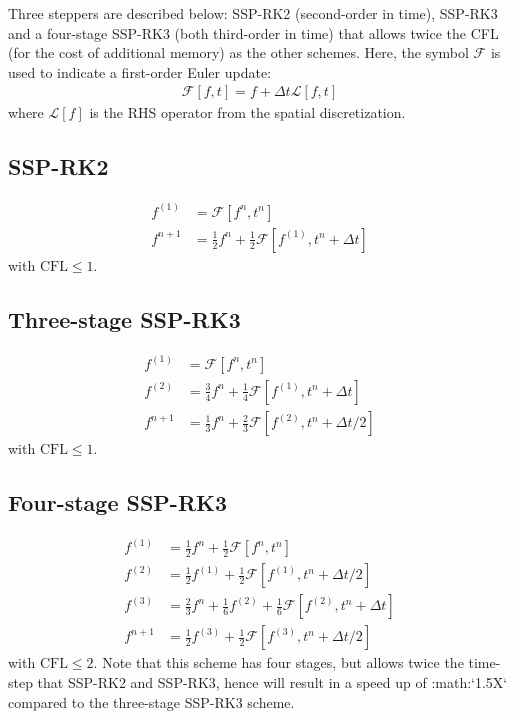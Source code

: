 \documentclass[12pt]{article}
\theoremstyle{definition}
\theoremstyle{definition}
\theoremstyle{definition}
\begin{document}
Three steppers are described below: SSP-RK2 (second-order in time),
SSP-RK3 and a four-stage SSP-RK3 (both third-order in time) that
allows twice the CFL (for the cost of additional memory) as the other
schemes. Here, the symbol $\mathcal{F}$ is used to indicate a
first-order Euler update:
\begin{align}
     \mathcal{F}[f,t] = f + \Delta t \mathcal{L}[f,t]
\end{align}
where $\mathcal{L}[f]$ is the RHS operator from the spatial
discretization.

\subsection*{SSP-RK2}

\begin{align}
   f^{(1)} &= \mathcal{F}[f^{n},t^n] \\
   f^{n+1} &= \frac{1}{2} f^{n} + \frac{1}{2}\mathcal{F}[f^{(1)},t^n+\Delta t]  
\end{align}
with $\mathrm{CFL}\le 1$.

\subsection*{Three-stage SSP-RK3}

\begin{align}
   f^{(1)} &= \mathcal{F}[f^{n},t^n] \\
   f^{(2)} &= \frac{3}{4} f^{n} + \frac{1}{4}\mathcal{F}[f^{(1)},t^n+\Delta t ] \\
   f^{n+1} &= \frac{1}{3} f^{n} + \frac{2}{3}\mathcal{F}[f^{(2)},t^n+\Delta t/2]  
\end{align}
with $\mathrm{CFL}\le 1$.

\subsection*{Four-stage SSP-RK3}

\begin{align}
   f^{(1)} &= \frac{1}{2} f^{n} + \frac{1}{2} \mathcal{F}[f^{n},t^n] \\
   f^{(2)} &= \frac{1}{2} f^{(1)} + \frac{1}{2} \mathcal{F}[f^{(1)},t^n+\Delta t/2] \\
   f^{(3)} &= \frac{2}{3} f^{n} + \frac{1}{6} f^{(2)} + \frac{1}{6} \mathcal{F}[f^{(2)},t^n+\Delta t] \\
   f^{n+1} &= \frac{1}{2} f^{(3)} + \frac{1}{2} \mathcal{F}[f^{(3)},t^n+\Delta t/2]
\end{align}
with $\mathrm{CFL}\le 2$. Note that this scheme has four stages, but
allows twice the time-step that SSP-RK2 and SSP-RK3, hence will result
in a speed up of :math:`1.5X` compared to the three-stage SSP-RK3
scheme.
\end{document}

